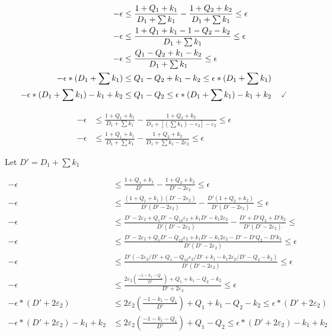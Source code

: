 \documentclass[11pt]{amsart}
\begin{document}

\begin{align*}
-\epsilon &\leq \frac{1 + Q_1 + k_1}{D_1 +  \sum k_1} - \frac{1 + Q_2 + k_2}{D_1 + \sum k_1} \leq \epsilon \\
-\epsilon &\leq \frac{1 + Q_1 + k_1 - 1 - Q_2 - k_2}{D_1 +  \sum k_1}  \leq \epsilon \\
-\epsilon &\leq \frac{Q_1 - Q_2 + k_1 - k_2}{D_1 +  \sum k_1}  \leq \epsilon \\
-\epsilon*(D_1 +  \sum k_1) &\leq Q_1 - Q_2 + k_1 - k_2  \leq \epsilon*(D_1 +  \sum k_1) \\
-\epsilon*(D_1 +  \sum k_1) - k_1 + k_2 &\leq Q_1 - Q_2  \leq \epsilon*(D_1 +  \sum k_1) - k_1 + k_2 \hspace{4mm}\checked
\end{align*}




\begin{align*}
-\epsilon &\leq \frac{1 + Q_1 + k_1}{D_1 +  \sum k_1} - \frac{1 + Q_2 + k_2}{D_1 + \left[ \left(\sum k_1\right) - \varepsilon_2\right] - \varepsilon_2}  \leq \epsilon \\
-\epsilon &\leq \frac{1 + Q_1 + k_1}{D_1 +  \sum k_1} - \frac{1 + Q_2 + k_2}{D_1 + \sum k_1 - 2\varepsilon_2}  \leq \epsilon
\end{align*}

Let $D' = D_1 + \sum k_1$

\begin{align*}
-\epsilon &\leq \frac{1 + Q_1 + k_1}{D'} - \frac{1 + Q_2 + k_2}{D' - 2\varepsilon_2}  \leq \epsilon \\
-\epsilon &\leq \frac{(1 + Q_1 + k_1)(D' - 2\varepsilon_2)}{D'(D' - 2\varepsilon_2)} - \frac{D'(1 + Q_2 + k_2)}{D'(D' - 2\varepsilon_2)}  \leq \epsilon \\
-\epsilon &\leq \frac{D' - 2\varepsilon_2 + Q_1D' - Q_12\varepsilon_2 + k_1D' - k_1 2\varepsilon_2}{D'(D' - 2\varepsilon_2)} - \frac{D' + D'Q_2 + D'k_2}{D'(D' - 2\varepsilon_2)}  \leq \\
-\epsilon &\leq \frac{D' - 2\varepsilon_2 + Q_1D' - Q_12\varepsilon_2 + k_1D' - k_1 2\varepsilon_2 - D' - D'Q_2 - D'k_2}{D'(D' - 2\varepsilon_2)}  \leq \epsilon \\
-\epsilon &\leq \frac{D'(-2\varepsilon_2 / D' + Q_1 - Q_12\varepsilon_2/D' + k_1 - k_1 2\varepsilon_2 / D'  - Q_2 - k_2)}{D'(D' - 2\varepsilon_2)}  \leq \epsilon \\
-\epsilon &\leq \frac{2\varepsilon_2 (\frac{-1 - k_1 - Q_1}{D'}) + Q_1 + k_1 - Q_2 - k_2}{D' + 2\varepsilon_2}  \leq \epsilon \\
-\epsilon*(D' + 2\varepsilon_2) &\leq 2\varepsilon_2 (\frac{-1 - k_1 - Q_1}{D'}) + Q_1 + k_1 - Q_2 - k_2  \leq \epsilon*(D' + 2\varepsilon_2) \\
-\epsilon*(D' + 2\varepsilon_2) - k_1 + k_2 &\leq 2\varepsilon_2 (\frac{-1 - k_1 - Q_1}{D'}) + Q_1 - Q_2 \leq \epsilon*(D' + 2\varepsilon_2) - k_1 + k_2 \\
\end{align*}
\end{document}
